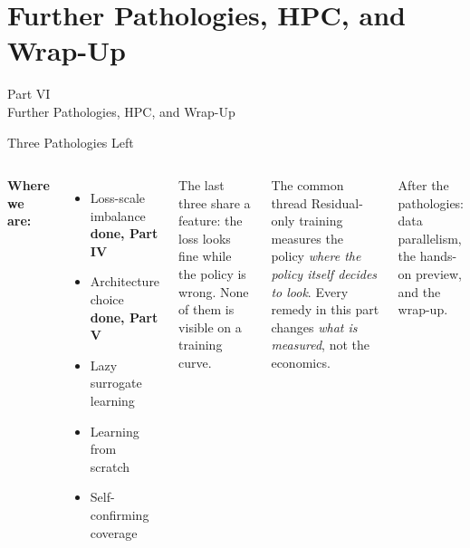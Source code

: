 \documentclass[aspectratio=169,11pt]{beamer}
\newcommand{\emphc}[1]{\textcolor{harvardcrimson}{#1}}
\begin{document}

\section{Further Pathologies, HPC, and Wrap-Up}

\begin{frame}{}
\begin{center}
{\Huge \textcolor{uzhblue}{Part VI}}\\[0.8em]
{\LARGE Further Pathologies, HPC, and Wrap-Up}
\end{center}
\end{frame}

\begin{frame}{Three Pathologies Left}
\begin{columns}[T]
\textbf{Where we are:}
\begin{itemize}\setlength\itemsep{4pt}
  \item[(a)] Loss-scale imbalance \hfill \textcolor{softgreen}{\textbf{done, Part IV}}
  \item[(b)] Architecture choice \hfill \textcolor{softgreen}{\textbf{done, Part V}}
  \item[(c)] \emphc{Lazy surrogate learning}
  \item[(d)] \emphc{Learning from scratch}
  \item[(e)] \emphc{Self-confirming coverage}
\end{itemize}

\vspace{0.6em}
The last three share a feature: the loss looks fine while the policy is wrong. None of them is visible on a training curve.

\begin{alertblock}{The common thread}
Residual-only training measures the policy \emph{where the policy itself decides to look}. Every remedy in this part changes \emph{what is measured}, not the economics.
\end{alertblock}

\vspace{0.4em}
{\footnotesize After the pathologies: data parallelism, the hands-on preview, and the wrap-up.}
\end{columns}
\end{frame}
\end{document}

